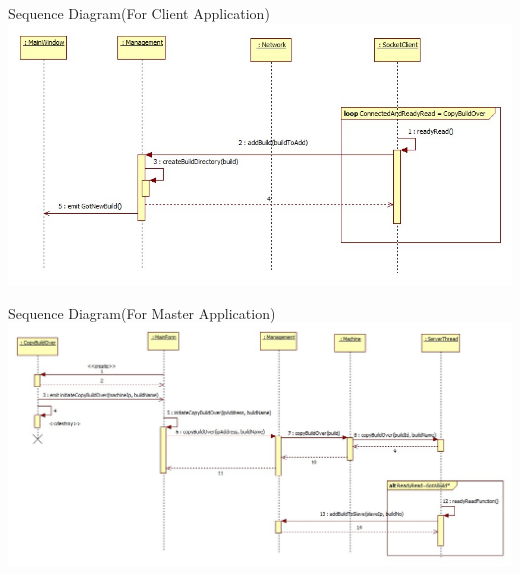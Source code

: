 \documentclass[a4paper,12pt,final]{article}
\begin{document}
\newpage
\begin{center}
Sequence Diagram(For Client Application)
\includegraphics[scale=0.4]{CommunicationProtocol/SequenceDiagrams/Client/CopyOver.jpg} 
\end{center}
\begin{center}
Sequence Diagram(For Master Application)
\includegraphics[scale=0.4]{CommunicationProtocol/SequenceDiagrams/Server/CopyOver.jpeg} 
\end{center}



\end{document}
